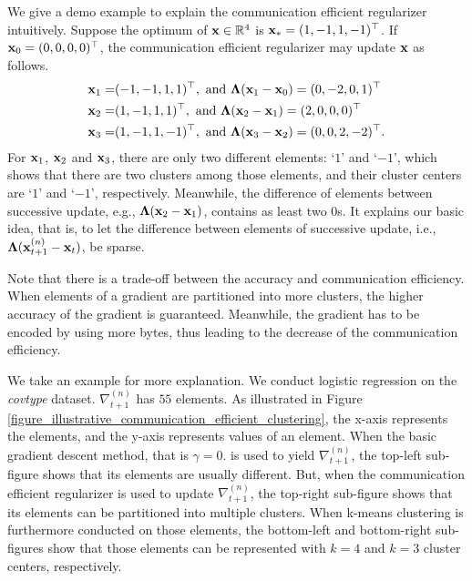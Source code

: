 \documentclass[journal]{IEEEtran}
\begin{document}
We give a demo example to explain the communication efficient regularizer intuitively. Suppose the optimum of ${\bf x}\in\mathbb{R}^4$ is ${\bf x}_{\ast} = (1, -1, 1, -1)^{\top}$. If ${\bf x}_0 = (0,0,0,0)^{\top}$, the communication efficient regularizer may update ${\bf x}$ as follows.
\begin{align}
\nonumber
{\bf x}_1 = & (-1,-1,1,1)^{\top}, \text{ and } \mathbf{\Lambda}({\bf x}_1-{\bf x}_0)= (0,-2,0,1)^{\top} \\ \nonumber
{\bf x}_2 = & (1,-1,1,1)^{\top}, \text{ and } \mathbf{\Lambda}({\bf x}_2-{\bf x}_1) = (2,0,0,0)^{\top} \\ \nonumber
{\bf x}_3 = & (1,-1,1,-1)^{\top}, \text{ and } \mathbf{\Lambda}({\bf x}_3-{\bf x}_2) = (0,0,2,-2)^{\top}.
\end{align} For ${\bf x}_1$, ${\bf x}_2$ and ${\bf x}_3$, there are only two different elements: `$1$' and `$-1$', which shows that there are two clusters among those elements, and their cluster centers are `$1$' and `$-1$', respectively. Meanwhile, the difference of elements between successive update, e.g., $\mathbf{\Lambda}({\bf x}_2-{\bf x}_1)$, contains as least two $0$s. It explains our basic idea, that is, to let the difference between elements of successive update, i.e., $\mathbf{\Lambda}({\bf x}^{(n)}_{t+1}-{\bf x}_t)$, be sparse. 
 
Note that there is a trade-off between the accuracy and communication efficiency. When elements of a gradient are partitioned into more clusters, the higher accuracy of the gradient is guaranteed. Meanwhile, the gradient has to be encoded by using more bytes, thus leading to the decrease of the communication efficiency.  

We take an example for more explanation. We conduct logistic regression on the \textit{covtype} dataset. $\nabla_{t+1}^{(n)}$ has $55$ elements. As illustrated in Figure \ref{figure_illustrative_communication_efficient_clustering}, the x-axis represents the elements, and the y-axis represents values of an element. When the basic gradient descent method, that is $\gamma = 0$. is used to yield $\nabla_{t+1}^{(n)}$, the top-left sub-figure shows that its elements are usually different. But, when the communication efficient regularizer is used to update $\nabla_{t+1}^{(n)}$, the top-right sub-figure shows that its elements can be partitioned into multiple clusters.  When k-means clustering is furthermore conducted on those elements, the bottom-left and bottom-right sub-figures show that those elements can be represented with $k=4$ and $k=3$ cluster centers, respectively.  
\end{document}
